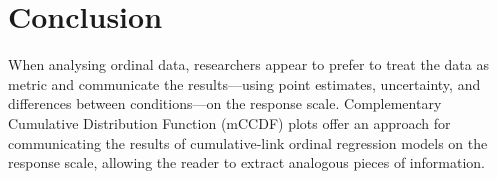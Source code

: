 \documentclass{vgtc}                          %
\newcommand{\ccdf}[1]{mCCDF#1}
\begin{document}
\section{Conclusion}
When analysing ordinal data, researchers appear to prefer to treat the data as metric and communicate the results---using point estimates, uncertainty, and differences between conditions---on the response scale. Complementary Cumulative Distribution Function (\ccdf) plots offer an approach for communicating the results of cumulative-link ordinal regression models on the response scale, allowing the reader to extract analogous pieces of information.





\end{document}
